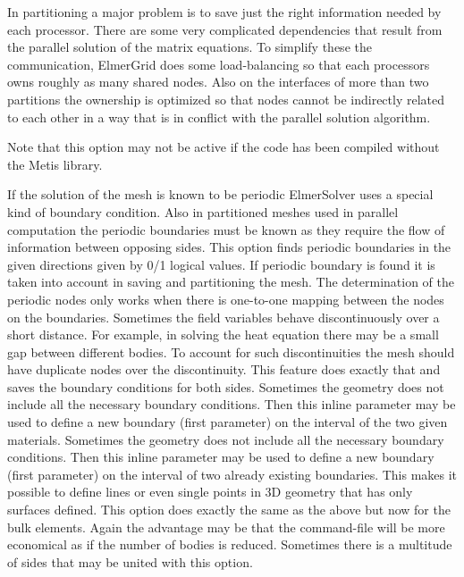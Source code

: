 In partitioning a major problem is to save just the right information
needed by each processor. There are some very complicated dependencies that
result from the parallel solution of the matrix equations. To simplify these
the communication, ElmerGrid does some load-balancing so that each processors
owns roughly as many shared nodes. Also on the interfaces of more than two
partitions the ownership is optimized so that nodes cannot be 
indirectly related to each other in a way that is in conflict with 
the parallel solution algorithm. 

Note that this option may not be active if the code has been compiled
without the Metis library.

If the solution of the mesh is known to be periodic ElmerSolver uses
a special kind of boundary condition. Also in partitioned meshes
used in parallel computation the periodic boundaries must be known
as they require the flow of information between opposing sides.
This option finds periodic boundaries in the given directions 
given by 0/1 logical values. If periodic boundary is found it is taken into
account in saving and partitioning the mesh.
The determination of the periodic nodes only works when there is one-to-one mapping
between the nodes on the boundaries. 
%
Sometimes the field variables behave discontinuously over a short distance.
For example, in solving the heat equation there may be a small gap between
different bodies. To account for such discontinuities the mesh should
have duplicate nodes over the discontinuity. This feature does exactly that
and saves the boundary conditions for both sides.
%
Sometimes the geometry does not include all the necessary boundary conditions. 
Then this inline parameter may be used to define a new boundary 
(first parameter) on the interval of the two given materials.
%
Sometimes the geometry does not include all the necessary boundary conditions. 
Then this inline parameter may be used to define a new boundary 
(first parameter) on the interval of two already existing boundaries.
This makes it possible to define lines or even single points 
in 3D geometry that has only surfaces defined.
%
This option does exactly the same as the above but now for the bulk elements.
Again the advantage may be that the command-file will be more economical as 
if the number of bodies is reduced.
%
Sometimes there is a multitude of sides that may be united with this option.

